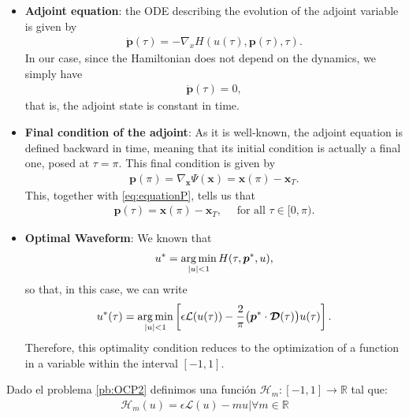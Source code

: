 \begin{itemize}
    \item[1.] \textbf{Adjoint equation}: the ODE describing the evolution of the adjoint variable is given by 
    \begin{align*}
    	\dot{\bm{p}}(\tau) = -\nabla_x H(u(\tau),\bm{p}(\tau),\tau).
    \end{align*}
    In our case, since the Hamiltonian does not depend on the dynamics, we simply have
    \begin{align}\label{eq:equationP}
    	\dot{\bm{p}}(\tau) = 0,
    \end{align}
	that is, the adjoint state is constant in time.
	
	\item[2.] \textbf{Final condition of the adjoint}: As it is well-known, the adjoint equation is defined backward in time, meaning that its initial condition is actually a final one, posed at $\tau=\pi$. This final condition is given by 
    \begin{align*}
    	\bm{p}(\pi) = \nabla_{\bm{x}} \Psi(\bm{x}) = \bm{x}(\pi) - \bm{x}_T.
    \end{align*} 
	This, together with \eqref{eq:equationP}, tells us that
	\begin{align*}
		\bm{p}(\tau) = \bm{x}(\pi) - \bm{x}_T, \quad \mbox{ for all }\tau\in [0,\pi).
	\end{align*} 
    
    \item[3.] \textbf{Optimal  Waveform}: We known that 
    \begin{align*}
    	u^* = \operatorname*{arg\,min}_{|u|<1} H(\tau,\bm{p}^*,u),
    \end{align*}
	so that, in this case, we can write
    \begin{gather}
        u^*(\tau) = \operatorname*{arg\,min}_{|u|<1}  \left[\epsilon \mathcal{L}(u(\tau)) - \frac 2\pi \big(\bm{p}^* \cdot \bm{\mathcal{D}}(\tau)\big) u(\tau) \right].
    \end{gather}
    Therefore, this optimality condition reduces to the optimization of a function in a variable within the interval $ [- 1,1] $. 
\end{itemize}
\vspace{1em}
\begin{definition}
    Dado el problema \ref{pb:OCP2} definimos una función $\mathcal{H}_m:[-1,1]\rightarrow \mathbb{R}$ tal que:
    \begin{gather}\label{Hm}
        \mathcal{H}_m(u) = \epsilon \mathcal{L}(u) - mu  |  \forall m \in \mathbb{R}
    \end{gather}
\end{definition}
